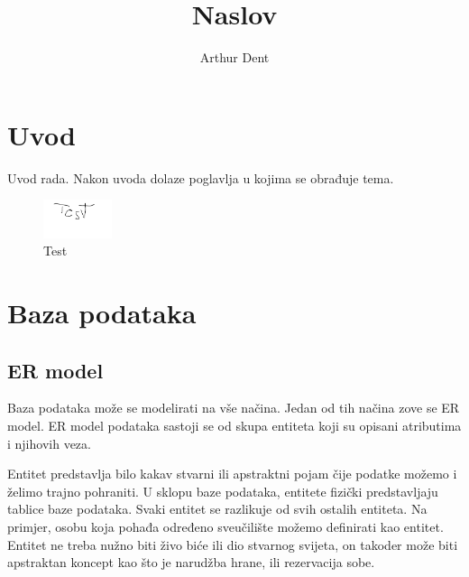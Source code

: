 \documentclass[times, utf8, zavrsni]{fer}
\begin{document}

\title{Naslov}

\author{Arthur Dent}

\maketitle

\izvornik

\zahvala{}

\tableofcontents

\chapter{Uvod}
Uvod rada. Nakon uvoda dolaze poglavlja u kojima se obrađuje tema.

\begin{figure}[htb]
\centering
\includegraphics[width=2cm]{img/test.png}
\caption{Test}
\label{fig:test}
\end{figure}

\chapter{Baza podataka}

\section{ER model}

Baza podataka može se modelirati na vše načina. Jedan od tih načina zove se ER model. ER model podataka sastoji se od skupa entiteta koji su opisani atributima i njihovih veza. 

Entitet predstavlja bilo kakav stvarni ili apstraktni pojam čije podatke možemo i želimo trajno pohraniti. U sklopu baze podataka, entitete fizički predstavljaju tablice baze podataka. Svaki entitet se razlikuje od svih ostalih entiteta. Na primjer, osobu koja pohađa određeno sveučilište možemo definirati kao entitet. Entitet ne treba nužno biti živo biće ili dio stvarnog svijeta, on takoder može biti apstraktan koncept kao što je narudžba hrane, ili rezervacija sobe. 
\end{document}
